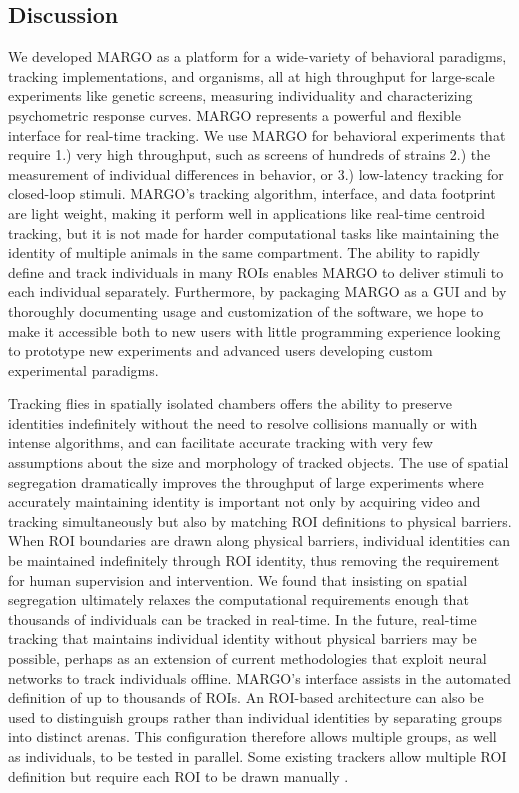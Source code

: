 \documentclass[10pt]{article}
\begin{document}
\begin{multicols}{2}
\section*{Discussion}

We developed MARGO as a platform for a wide-variety of behavioral paradigms, tracking implementations, and organisms, all at high throughput for large-scale experiments like genetic screens, measuring individuality and characterizing psychometric response curves. MARGO represents a powerful and flexible interface for real-time tracking. We use MARGO for behavioral experiments that require 1.) very high throughput, such as screens of hundreds of strains 2.) the measurement of individual differences in behavior, or 3.) low-latency tracking for closed-loop stimuli. MARGO's tracking algorithm, interface, and data footprint are light weight, making it perform well in applications like real-time centroid tracking, but it is not made for harder computational tasks like maintaining the identity of multiple animals in the same compartment. The ability to rapidly define and track individuals in many ROIs enables MARGO to deliver stimuli to each individual separately. Furthermore, by packaging MARGO as a GUI and by thoroughly documenting usage and customization of the software, we hope to make it accessible both to new users with little programming experience looking to prototype new experiments and advanced users developing custom experimental paradigms.

Tracking flies in spatially isolated chambers offers the ability to preserve identities indefinitely without the need to resolve collisions manually or with intense algorithms, and can facilitate accurate tracking with very few assumptions about the size and morphology of tracked objects. The use of spatial segregation dramatically improves the throughput of large experiments where accurately maintaining identity is important not only by acquiring video and tracking simultaneously but also by matching ROI definitions to physical barriers. When ROI boundaries are drawn along physical barriers, individual identities can be maintained indefinitely through ROI identity, thus removing the requirement for human supervision and intervention. We found that insisting on spatial segregation ultimately relaxes the computational requirements enough that thousands of individuals can be tracked in real-time. In the future, real-time tracking that maintains individual identity without physical barriers may be possible, perhaps as an extension of current methodologies that exploit neural networks to track individuals offline\cite{romero-ferrero_2019,schneider_2018}. MARGO's interface assists in the automated definition of up to thousands of ROIs. An ROI-based architecture can also be used to distinguish groups rather than individual identities by separating groups into distinct arenas. This configuration therefore allows multiple groups, as well as individuals, to be tested in parallel. Some existing trackers allow multiple ROI definition but require each ROI to be drawn manually \cite{Prez-Escudero_idTracker_2014,Mnck_BioTracker_2018}.


\end{multicols}
\end{document}
